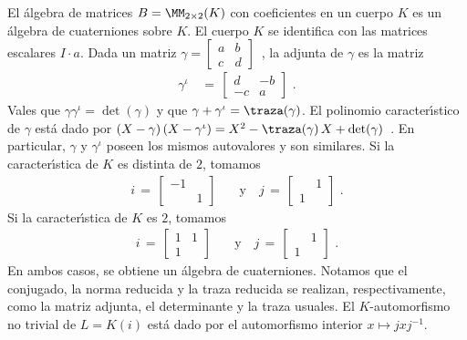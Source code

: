 \begin{ejemploMatrices}\label{ejemplo:matrices}
	El \'{a}lgebra de matrices $B=\MM_{2\times 2}(K)$ con coeficientes en
	un cuerpo $K$ es un \'{a}lgebra de cuaterniones sobre $K$. El cuerpo
	$K$ se identifica con las matrices escalares $I\cdot a$. Dada un matriz
	\begin{math}
		\gamma=\begin{bmatrix} a & b \\ c & d \end{bmatrix}
	\end{math}~,
	la adjunta de $\gamma$ es la matriz
	\begin{align*}
		\gamma^\iota & \,=\,
			\begin{bmatrix} d & -b \\
			-c & a \end{bmatrix}
		\text{ .}
	\end{align*}
	Vales que $\gamma\gamma^\iota=\det(\gamma)$ y que
	$\gamma+\gamma^\iota=\traza(\gamma)$. El polinomio caracter\'{\i}stico
	de $\gamma$ est\'{a} dado por
	\begin{math}
		(X-\gamma)\,(X-\gamma^\iota)=
			X^{2}-\traza(\gamma)\,X+\det(\gamma)
	\end{math}~.
	En particular, $\gamma$ y $\gamma^\iota$ poseen los mismos autovalores
	y son similares.
	Si la caracter\'{\i}stica de $K$ es distinta de $2$, tomamos
	\begin{align*}
		i\,=\,\begin{bmatrix} -1 & \\ & 1 \end{bmatrix} &
			\quad\text{y}\quad
		j \,=\,\begin{bmatrix} & 1 \\ 1 & \end{bmatrix}
		\text{ .}
	\end{align*}
	Si la caracter\'{\i}stica de $K$ es $2$, tomamos
	\begin{align*}
		i\,=\,\begin{bmatrix} 1 & 1 \\ 1 & \end{bmatrix}
			& \quad\text{y}\quad
		j\,=\,\begin{bmatrix} & 1 \\ 1 & \end{bmatrix}
		\text{ .}
	\end{align*}
	En ambos casos, se obtiene un \'{a}lgebra de cuaterniones. Notamos que
	el conjugado, la norma reducida y la traza reducida se realizan,
	respectivamente, como la matriz adjunta, el determinante y la traza
	usuales. El $K$-automorfismo no trivial de $L=K(i)$ est\'{a} dado por
	el automorfismo interior $x\mapsto jxj^{-1}$.


\end{ejemploMatrices}
